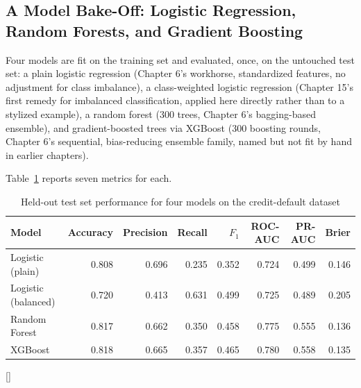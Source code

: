 \documentclass[../ai_in_finance]{subfiles}
\begin{document}
\subsection{A Model Bake-Off: Logistic Regression, Random Forests, and Gradient Boosting}
\label{sec:capstone-bakeoff}

Four models are fit on the training set and evaluated, once, on the untouched test set: a plain logistic regression (Chapter 6's workhorse, standardized features, no adjustment for class imbalance), a class-weighted logistic regression (Chapter 15's first remedy for imbalanced classification, applied here directly rather than to a stylized example), a random forest (300 trees, Chapter 6's bagging-based ensemble), and gradient-boosted trees via XGBoost (300 boosting rounds, Chapter 6's sequential, bias-reducing ensemble family, named but not fit by hand in earlier chapters).

Table~\ref{tab:capstone_bakeoff} reports seven metrics for each.

\begin{table}[htbp]
\centering
\begin{lrbox}{\bookmeasuredbox}
\begin{tabular}{lrrrrrrr}
\toprule
Model & Accuracy & Precision & Recall & $F_1$ & ROC-AUC\index{ROC curve} & PR-AUC & Brier \\
\midrule
Logistic (plain) & 0.808 & 0.696 & 0.235 & 0.352 & 0.724 & 0.499 & 0.146 \\
Logistic (balanced) & 0.720 & 0.413 & 0.631 & 0.499 & 0.725 & 0.489 & 0.205 \\
Random Forest & 0.817 & 0.662 & 0.350 & 0.458 & 0.775 & 0.555 & 0.136 \\
XGBoost & 0.818 & 0.665 & 0.357 & 0.465 & 0.780 & 0.558 & 0.135 \\
\bottomrule
\end{tabular}
\end{lrbox}
\ifdim\wd\bookmeasuredbox<0.65\linewidth
\setlength{\bookcapwidth}{0.65\linewidth}
\else
\setlength{\bookcapwidth}{\wd\bookmeasuredbox}
\fi
{}[\bookcapwidth]{
\usebox{\bookmeasuredbox}
}{
\caption{Held-out test set performance for four models on the credit-default dataset}
\label{tab:capstone_bakeoff}
}
\end{table}
\end{document}
